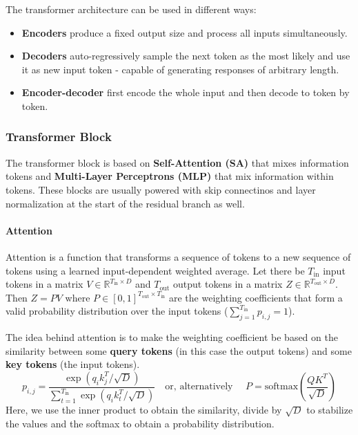 \documentclass{article}
\newcommand{\R}{\mathbb{R}}
\begin{document}
The transformer architecture can be used in different ways:
\begin{itemize}
    \item \textbf{Encoders} produce a fixed output size and process all inputs simultaneously.
    \item \textbf{Decoders} auto-regressively sample the next token as the most likely and use it as new input token - capable of generating responses of arbitrary length.
    \item \textbf{Encoder-decoder} first encode the whole input and then decode to token by token.
\end{itemize}

\subsubsection{Transformer Block}

The transformer block is based on \textbf{Self-Attention (SA)} that mixes information tokens and \textbf{Multi-Layer Perceptrons (MLP)} that mix information within tokens.
These blocks are usually powered with skip connectinos and layer normalization at the start of the residual branch as well.

\paragraph{Attention}

Attention is a function that transforms a sequence of tokens to a new sequence of tokens using a learned input-dependent weighted average.
Let there be $T_\text{in}$ input tokens in a matrix $V \in \R^{T_\text{in} \times D}$ and $T_\text{out}$ output tokens in a matrix $Z \in \R^{T_\text{out} \times D}$.
Then $Z = PV$ where $P \in [0,1]^{T_\text{out} \times T_\text{in}}$ are the weighting coefficients that form a valid probability distribution over the input tokens ($\sum_{j=1}^{T_\text{in}} p_{i,j} = 1$).

The idea behind attention is to make the weighting coefficient be based on the similarity between some \textbf{query tokens} (in this case the output tokens) and some \textbf{key tokens} (the input tokens).
$$
p_{i,j} = \frac{\exp(q_i k_j^T / \sqrt{D})}{\sum_{t=1}^{T_\text{in}} \exp \left( q_i k_t^T / \sqrt{D} \right)}
\quad \text {or, alternatively } \quad
P = \text{softmax}\left( \frac{QK^T}{\sqrt{D}} \right)
$$
Here, we use the inner product to obtain the similarity, divide by $\sqrt{D}$ to stabilize the values and the softmax to obtain a probability distribution. 
\end{document}
